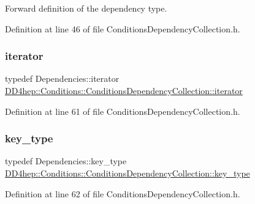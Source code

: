 Forward definition of the dependency type. 



Definition at line 46 of file Conditions\+Dependency\+Collection.\+h.

\hypertarget{class_d_d4hep_1_1_conditions_1_1_conditions_dependency_collection_a685a1a6841f2fa4d70ab9a9bfb7b0b6a}{}\label{class_d_d4hep_1_1_conditions_1_1_conditions_dependency_collection_a685a1a6841f2fa4d70ab9a9bfb7b0b6a} 
\subsubsection{\texorpdfstring{iterator}{iterator}}
{\footnotesize\ttfamily typedef Dependencies\+::iterator \hyperlink{class_d_d4hep_1_1_conditions_1_1_conditions_dependency_collection_a685a1a6841f2fa4d70ab9a9bfb7b0b6a}{D\+D4hep\+::\+Conditions\+::\+Conditions\+Dependency\+Collection\+::iterator}}



Definition at line 61 of file Conditions\+Dependency\+Collection.\+h.

\hypertarget{class_d_d4hep_1_1_conditions_1_1_conditions_dependency_collection_a97fa0f42a622cd23c6eeb92e2b63efab}{}\label{class_d_d4hep_1_1_conditions_1_1_conditions_dependency_collection_a97fa0f42a622cd23c6eeb92e2b63efab} 
\subsubsection{\texorpdfstring{key\+\_\+type}{key\_type}}
{\footnotesize\ttfamily typedef Dependencies\+::key\+\_\+type \hyperlink{class_d_d4hep_1_1_conditions_1_1_conditions_dependency_collection_a97fa0f42a622cd23c6eeb92e2b63efab}{D\+D4hep\+::\+Conditions\+::\+Conditions\+Dependency\+Collection\+::key\+\_\+type}}



Definition at line 62 of file Conditions\+Dependency\+Collection.\+h.

